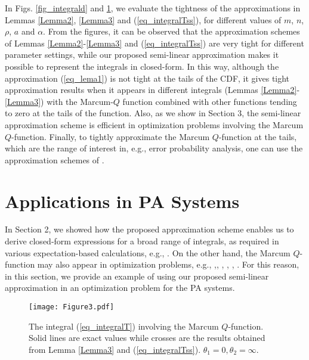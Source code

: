 In Figs. \ref{fig_integrald} and \ref{fig_t2}, we evaluate the tightness of the approximations in Lemmas \ref{Lemma2}, \ref{Lemma3} and (\ref{eq_integralTss}), for different values of $m$, $n$, $\rho$, $a$ and $\alpha$. From the figures, it can be observed that the approximation schemes of   Lemmas \ref{Lemma2}-\ref{Lemma3} and (\ref{eq_integralTss}) are very tight for different parameter settings, while our proposed semi-linear approximation makes it possible to represent the integrals in closed-form.  In this way, although the approximation (\ref{eq_lema1}) is not tight at the tails of the CDF, it gives tight approximation results when it appears in different integrals (Lemmas \ref{Lemma2}-\ref{Lemma3}) with the Marcum-$Q$ function  combined with other functions tending to zero at the tails of the function. Also, as we show in Section 3, the semi-linear approximation scheme is efficient in optimization problems involving the Marcum $Q$-function. Finally, to tightly approximate the Marcum $Q$-function at the tails, which are the range of interest in, e.g., error probability analysis, one can use the approximation schemes of \cite{Simon2000TCexponential,annamalai2001WCMCcauchy}. 







\section{Applications in PA Systems}
In Section 2, we showed how the proposed approximation scheme enables us to derive closed-form expressions for a broad range of integrals, as required in various expectation-based calculations, e.g., \cite{Simon2003TWCsome,Cao2016CLsolutions,sofotasios2015solutions,Cui2012ELtwo,Gaur2003TVTsome,Simon2000TCexponential,6911973}. On the other hand, the Marcum $Q$-function may also  appear in  optimization problems, e.g., \cite[eq. (8)]{Azari2018TCultra},\cite[eq. (9)]{Alam2014INFOCOMWrobust}, \cite[eq. (10)]{Gao2018IAadmm}, \cite[eq. (10)]{Shen2018TVToutage}, \cite[eq. (15)]{Song2017JLTimpact}, \cite[eq. (22)]{Tang2019IAan}.  For this reason, in this section, we provide an example of using our proposed semi-linear approximation in an optimization problem for the PA systems.

\begin{figure}
\centering
  \texttt{[image: Figure3.pdf]}\\
\caption{The integral (\ref{eq_integralT}) involving the Marcum $Q$-function. Solid lines are exact values while crosses are the results obtained from Lemma \ref{Lemma3} and (\ref{eq_integralTss}). $\theta_1 = 0, \theta_2 = \infty$. }\label{fig_t2}
\end{figure}

